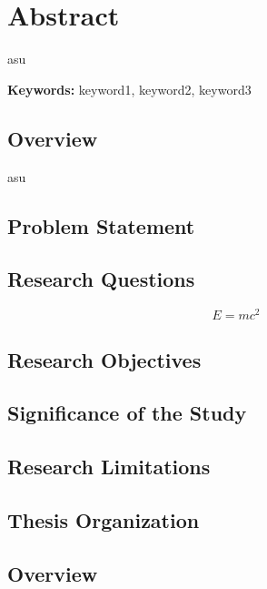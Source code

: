 \documentclass{thesis-library}
\begin{document}
\listofmyequations



\chapter*{Abstract}
\Gls{asu} 
\lipsum[4-5]


\noindent\textbf{Keywords:} keyword1, keyword2, keyword3




\newpage
{}

\section{Overview}
\Gls{asu}
\lipsum[6-7]

\section{Problem Statement}
\lipsum[8-9]

\section{Research Questions}
\lipsum[10]

\begin{equation}
\label{eq:massenergy}
E = mc^2
\end{equation}

\section{Research Objectives}
\lipsum[11]

\section{Significance of the Study}
\lipsum[12]
\section{Research Limitations}
\lipsum[13]
\section{Thesis Organization} 
\lipsum[14]

\section{Overview}
\lipsum[15]
\end{document}
